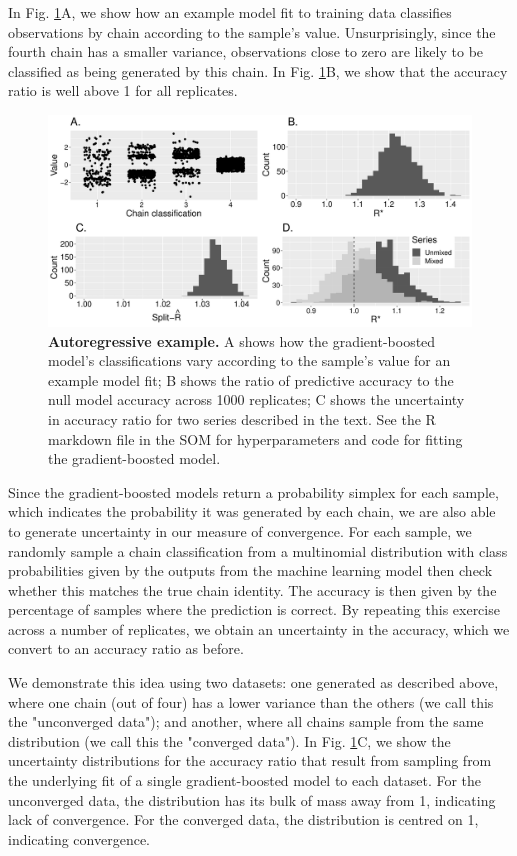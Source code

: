 \documentclass{article}
\begin{document}
In Fig. \ref{fig:ar1}A, we show how an example model fit to training data classifies observations by chain according to the sample's value. Unsurprisingly, since the fourth chain has a smaller variance, observations close to zero are likely to be classified as being generated by this chain. In Fig. \ref{fig:ar1}B, we show that the accuracy ratio is well above 1 for all replicates.

\begin{figure}[h]
	\centerline{\includegraphics[width=1.0\textwidth]{../output/ar1.pdf}}
	\caption{\textbf{Autoregressive example.} A shows how the gradient-boosted model's classifications vary according to the sample's value for an example model fit; B shows the ratio of predictive accuracy to the null model accuracy across 1000 replicates; C shows the uncertainty in accuracy ratio for two series described in the text. See the R markdown file in the SOM for hyperparameters and code for fitting the gradient-boosted model.}
	\label{fig:ar1}
\end{figure}

Since the gradient-boosted models return a probability simplex for each sample, which indicates the probability it was generated by each chain, we are also able to generate uncertainty in our measure of convergence. For each sample, we randomly sample a chain classification from a multinomial distribution with class probabilities given by the outputs from the machine learning model then check whether this matches the true chain identity. The accuracy is then given by the percentage of samples where the prediction is correct. By repeating this exercise across a number of replicates, we obtain an uncertainty in the accuracy, which we convert to an accuracy ratio as before.

We demonstrate this idea using two datasets: one generated as described above, where one chain (out of four) has a lower variance than the others (we call this the "unconverged data"); and another, where all chains sample from the same distribution (we call this the "converged data"). In Fig. \ref{fig:ar1}C, we show the uncertainty distributions for the accuracy ratio that result from sampling from the underlying fit of a single gradient-boosted model to each dataset. For the unconverged data, the distribution has its bulk of mass away from 1, indicating lack of convergence. For the converged data, the distribution is centred on 1, indicating convergence. 
\end{document}
